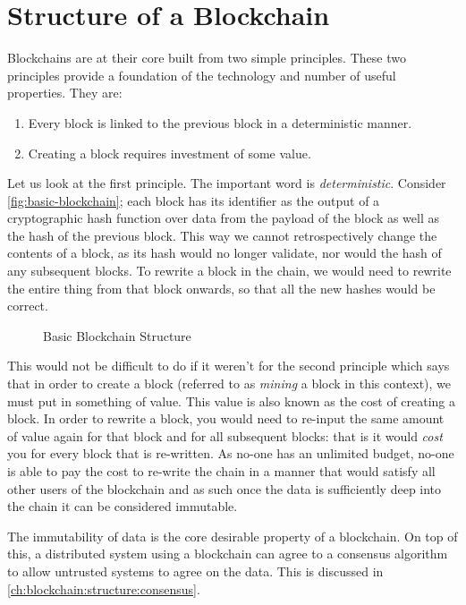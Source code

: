 \section{Structure of a Blockchain}
\label{ch:blockchain:structure}

Blockchains are at their core built from two simple principles. These two principles provide a foundation of the technology and number of useful properties. They are:

\begin{enumerate}
    \item Every block is linked to the previous block in a deterministic manner.
    \item Creating a block requires investment of some value.
\end{enumerate}

Let us look at the first principle. The important word is \emph{deterministic}. Consider \autoref{fig:basic-blockchain}; each block has its identifier as the output of a cryptographic hash function over data from the payload of the block as well as the hash of the previous block. This way we cannot retrospectively change the contents of a block, as its hash would no longer validate, nor would the hash of any subsequent blocks. To rewrite a block in the chain, we would need to rewrite the entire thing from that block onwards, so that all the new hashes would be correct.


\begin{figure}
    \centering
    
    \caption{Basic Blockchain Structure}
    \label{fig:basic-blockchain}
\end{figure}


This would not be difficult to do if it weren't for the second principle which says that in order to create a block (referred to as \emph{mining} a block in this context), we must put in something of value. This value is also known as the cost of creating a block. In order to rewrite a block, you would need to re-input the same amount of value again for that block and for all subsequent blocks: that is it would \emph{cost} you for every block that is re-written. As no-one has an unlimited budget, no-one is able to pay the cost to re-write the chain in a manner that would satisfy all other users of the blockchain and as such once the data is sufficiently deep into the chain it can be considered immutable.

The immutability of data is the core desirable property of a blockchain. On top of this, a distributed system using a blockchain can agree to a consensus algorithm to allow untrusted systems to agree on the data. This is discussed in \autoref{ch:blockchain:structure:consensus}.

